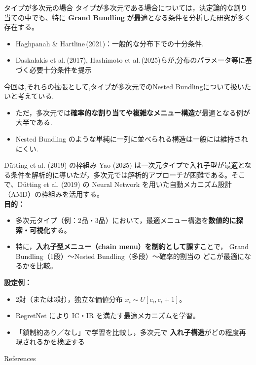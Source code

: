 \documentclass[dvipdfmx,professionalfonts]{beamer} %
\begin{document}
\begin{frame}{タイプが多次元の場合}
タイプが多次元である場合については，決定論的な割り当ての中でも、特に \textbf{Grand Bundling} が最適となる条件を分析した研究が多く存在する。\\[4pt]
\small
\begin{itemize}
  \item Haghpanah \& Hartline\,(2021)：一般的な分布下での十分条件.
  \item Daskalakis et al.\,(2017), Hashimoto et al.\,(2025)らが,分布のパラメータ等に基づく必要十分条件を提示
\end{itemize}

今回は,それらの拡張として,タイプが多次元でのNested Bundlingについて扱いたいと考えている.

\small
\begin{itemize}
    \item ただ，多次元では\textbf{確率的な割り当てや複雑なメニュー構造}が最適となる例が大半である.
    \item Nested Bundling のような単純に一列に並べられる構造は一般には維持されにくい.
\end{itemize}
\end{frame}

\begin{frame}{Dütting et al. (2019) の枠組み}
Yao (2025) は一次元タイプで入れ子型が最適となる条件を解析的に導いたが，多次元では解析的アプローチが困難である。そこで、Dütting et al. (2019) の Neural Network を用いた自動メカニズム設計（AMD）の枠組みを活用する。\\[8pt]
\textbf{目的：}
\begin{itemize}\itemsep2pt
  \item 多次元タイプ（例：2品・3品）において，最適メニュー構造を\textbf{数値的に探索・可視化}する。
  \item 特に，\textbf{入れ子型メニュー（chain menu）を制約として課す}ことで，
        Grand Bundling（1段）～Nested Bundling（多段）～確率的割当の
        どこが最適になるかを比較。
\end{itemize}
\textbf{設定例：}
\begin{itemize}\itemsep2pt
  \item 2財（または3財），独立な価値分布 $x_i\sim U[c_i,c_i+1]$。
  \item RegretNet により IC・IR を満たす最適メカニズムを学習。
  \item 「鎖制約あり／なし」で学習を比較し，多次元で
        \textbf{入れ子構造}がどの程度再現されるかを検証する
\end{itemize}
\end{frame}

\begin{frame}[allowframebreaks]{References}
  \printbibliography[heading=none]
  \nocite{*}
\end{frame}
\end{document}
